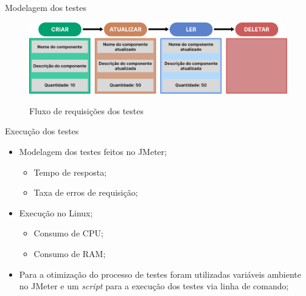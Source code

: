 \documentclass{libs/ufc_format}
\begin{document}

\begin{frame}{Modelagem dos testes}
    \begin{figure}[H]
        \centering
        \caption{Fluxo de requisições dos testes}
        \includegraphics[width=1\linewidth]{figuras/fluxo-requisicoes-testes.pdf}
        \captionsetup{justification=centering}
        \label{fig:fluxo-requisicoes-testes}
    \end{figure}
\end{frame}

\begin{frame}{Execução dos testes}
    \begin{itemize}
        \item Modelagem dos testes feitos no JMeter\nocite{jmeter}\let\thefootnote\relax{};
            \begin{itemize}
                \item Tempo de resposta;
                \item Taxa de erros de requisição;
            \end{itemize}
        \vspace*{0.5em}
        \item Execução no Linux;
            \begin{itemize}
                \item Consumo de CPU;
                \item Consumo de RAM;
            \end{itemize}
        \vspace*{0.5em}
        \item Para a otimização do processo de testes foram utilizadas variáveis ambiente no JMeter e um \textit{script} para a execução dos testes via linha de comando;
    \end{itemize}
\end{frame}
\end{document}
